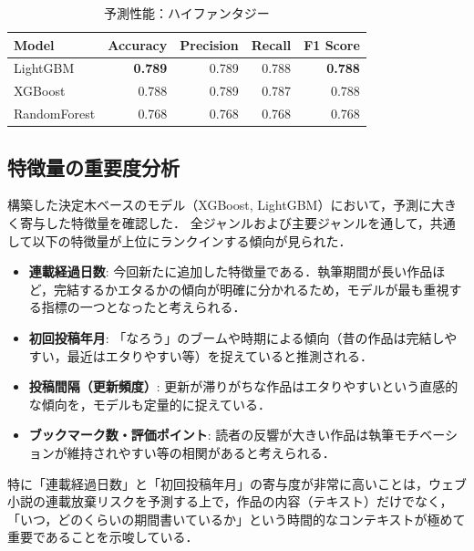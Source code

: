 \documentclass[uplatex, dvipdfmx, 11pt, a4paper, report]{jsbook}
\begin{document}
\begin{table}[H]
  \centering
  \caption{予測性能：ハイファンタジー}
  \label{tab:result_high_fantasy}
  \begin{tabular}{lrrrr} \hline
    Model & Accuracy & Precision & Recall & F1 Score \\ \hline
    LightGBM & \textbf{0.789} & 0.789 & 0.788 & \textbf{0.788} \\
    XGBoost & 0.788 & 0.789 & 0.787 & 0.788 \\
    RandomForest & 0.768 & 0.768 & 0.768 & 0.768 \\ \hline
  \end{tabular}
\end{table}

\subsection{特徴量の重要度分析}
構築した決定木ベースのモデル（XGBoost, LightGBM）において，予測に大きく寄与した特徴量を確認した．
全ジャンルおよび主要ジャンルを通して，共通して以下の特徴量が上位にランクインする傾向が見られた．

\begin{itemize}
  \item \textbf{連載経過日数}: 
  今回新たに追加した特徴量である．執筆期間が長い作品ほど，完結するかエタるかの傾向が明確に分かれるため，モデルが最も重視する指標の一つとなったと考えられる．
  \item \textbf{初回投稿年月}: 
  「なろう」のブームや時期による傾向（昔の作品は完結しやすい，最近はエタりやすい等）を捉えていると推測される．
  \item \textbf{投稿間隔（更新頻度）}: 
  更新が滞りがちな作品はエタりやすいという直感的な傾向を，モデルも定量的に捉えている．
  \item \textbf{ブックマーク数・評価ポイント}: 
  読者の反響が大きい作品は執筆モチベーションが維持されやすい等の相関があると考えられる．
\end{itemize}

特に「連載経過日数」と「初回投稿年月」の寄与度が非常に高いことは，ウェブ小説の連載放棄リスクを予測する上で，作品の内容（テキスト）だけでなく，「いつ，どのくらいの期間書いているか」という時間的なコンテキストが極めて重要であることを示唆している．
\end{document}
